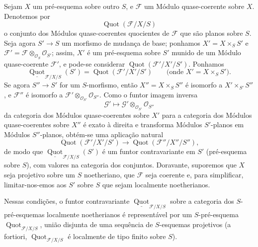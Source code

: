 
Sejam $X$ um pré-esquema sobre outro $S$, e $\mathcal F$ um Módulo
quase-coerente sobre $X$. Denotemos por
\[
\operatorname{Quot}(\mathcal F/X/S)
\]
o conjunto dos Módulos quase-coerentes quocientes de $\mathcal F$ que são
planos sobre $S$. Seja agora $S'\longrightarrow S$ um morfismo de mudança de
base; ponhamos $X'=X\times_S S'$ e
$\mathcal F'=\mathcal F\otimes_{\mathcal O_S}\mathcal O_{S'}$; assim, $X'$
é um pré-esquema sobre $S'$ munido de um Módulo
quase-coerente $\mathcal F'$, e pode-se considerar
$\operatorname{Quot}(\mathcal F'/X'/S')$. Ponhamos
\[
\underline{\operatorname{Quot}}_{\mathcal F/X/S}(S')
=\operatorname{Quot}(\mathcal F'/X'/S')
\qquad\text{(onde $X'=X\times_SS'$)}.
\]
Se agora $S''\longrightarrow S'$ for um $S$-morfismo, então
$X''=X\times_SS''$ é isomorfo a $X'\times_{S'}S''$, e $\mathcal F''$ é
isomorfo a $\mathcal F'\otimes_{\mathcal O_{S'}}\mathcal O_{S''}$. Como o
funtor imagem inversa
\[
\mathcal G'\longmapsto
\mathcal G'\otimes_{\mathcal O_{S'}}\mathcal O_{S''}
\]
da categoria dos Módulos quase-coerentes sobre $X'$ para a categoria dos
Módulos quase-coerentes sobre $X''$ é exato à direita e transforma Módulos
$S'$-planos em Módulos $S''$-planos, obtém-se uma aplicação natural
\[
\operatorname{Quot}(\mathcal F'/X'/S')\longrightarrow
\operatorname{Quot}(\mathcal F''/X''/S''),
\]
de modo que $\underline{\operatorname{Quot}}_{\mathcal F/X/S}(S')$ é um
funtor contravariante em $S'$ (pré-esquema sobre $S$), com valores na categoria
dos conjuntos. Doravante, suporemos que $X$ seja projetivo sobre um $S$
noetheriano, que $\mathcal F$ seja coerente e, para simplificar, limitar-nos-emos
aos $S'$ sobre $S$ que sejam localmente noetherianos.

 Nessas condições, o funtor contravariante
$\underline{\operatorname{Quot}}_{\mathcal F/X/S}$ sobre a categoria dos
$S$-pré-esquemas localmente noetherianos é representável por um
$S$-pré-esquema $\operatorname{Quot}_{\mathcal F/X/S}$, união disjunta de uma
sequência de $S$-esquemas projetivos (a fortiori,
$\operatorname{Quot}_{\mathcal F/X/S}$ é localmente de tipo finito sobre
$S$).

